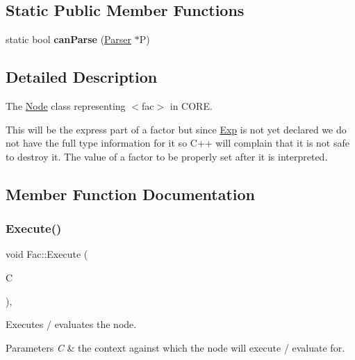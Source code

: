 \subsection*{Static Public Member Functions}
\begin{DoxyCompactItemize}
\item 
\mbox{\label{class_fac_a3d11351ed8e529e021430080a0aa2f3f}} 
static bool {\bfseries can\+Parse} (\mbox{\hyperlink{class_parser}{Parser}} $\ast$P)
\end{DoxyCompactItemize}


\subsection{Detailed Description}
The \mbox{\hyperlink{class_node}{Node}} class representing {\ttfamily $<$fac$>$} in C\+O\+RE. 

This will be the express part of a factor but since \mbox{\hyperlink{class_exp}{Exp}} is not yet declared we do not have the full type information for it so C++ will complain that it is not safe to destroy it. The value of a factor to be properly set after it is interpreted. 

\subsection{Member Function Documentation}
\mbox{\label{class_fac_a9448c1c51e8f79edce0ac7c7cda21c58}} 
\subsubsection{\texorpdfstring{Execute()}{Execute()}}
{\footnotesize\ttfamily void Fac\+::\+Execute (\begin{DoxyParamCaption}\item[{\mbox{\hyperlink{class_a_s_t_context}{A\+S\+T\+Context}} \&}]{C }\end{DoxyParamCaption})\hspace{0.3cm}{\ttfamily [override]}, {\ttfamily [virtual]}}

Executes / evaluates the node. 
\begin{DoxyParams}{Parameters}
{\em C} & the context against which the node will execute / evaluate for. \\
\hline
\end{DoxyParams}


